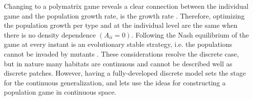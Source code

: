 
Changing to a polymatrix game reveals a clear connection between the individual game and the population growth rate,  is the growth rate . Therefore, optimizing the population growth per type and at the individual level are the same when there is no density dependence $(A_{ii}=0)$. Following the Nash equilibrium of the game  at every instant is an evolutionary stable strategy, i.e. the populations cannot be invaded by mutants \citep{kvrivan2009evolutionary}. These considerations resolve the discrete case, but in nature many habitats are continuous and cannot be described well as discrete patches. However, having a fully-developed discrete model sets the stage for the continuous generalization, and lets use the ideas for constructing a population game in continuous space.

